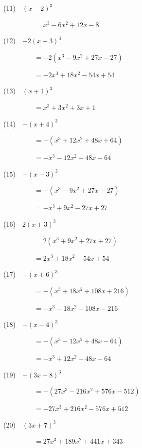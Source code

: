 \documentclass[a4j,twocolumn,10pt,fleqn]{jarticle}
\begin{document}
(11)~~$\left(x - 2\right)^{3}$

~~~~~~~~~$=x^{3} - 6 x^{2} + 12 x - 8$

(12)~~$-2\left(x - 3\right)^{3}$

~~~~~~~~~$=-2(x^{3} - 9 x^{2} + 27 x - 27)$

~~~~~~~~~$=- 2 x^{3} + 18 x^{2} - 54 x + 54$

(13)~~$\left(x + 1\right)^{3}$

~~~~~~~~~$=x^{3} + 3 x^{2} + 3 x + 1$

(14)~~$-\left(x + 4\right)^{3}$

~~~~~~~~~$=-(x^{3} + 12 x^{2} + 48 x + 64)$

~~~~~~~~~$=- x^{3} - 12 x^{2} - 48 x - 64$

(15)~~$-\left(x - 3\right)^{3}$

~~~~~~~~~$=-(x^{3} - 9 x^{2} + 27 x - 27)$

~~~~~~~~~$=- x^{3} + 9 x^{2} - 27 x + 27$

(16)~~$2\left(x + 3\right)^{3}$

~~~~~~~~~$=2(x^{3} + 9 x^{2} + 27 x + 27)$

~~~~~~~~~$=2 x^{3} + 18 x^{2} + 54 x + 54$

(17)~~$-\left(x + 6\right)^{3}$

~~~~~~~~~$=-(x^{3} + 18 x^{2} + 108 x + 216)$

~~~~~~~~~$=- x^{3} - 18 x^{2} - 108 x - 216$

(18)~~$-\left(x - 4\right)^{3}$

~~~~~~~~~$=-(x^{3} - 12 x^{2} + 48 x - 64)$

~~~~~~~~~$=- x^{3} + 12 x^{2} - 48 x + 64$

(19)~~$-\left(3 x - 8\right)^{3}$

~~~~~~~~~$=-(27 x^{3} - 216 x^{2} + 576 x - 512)$

~~~~~~~~~$=- 27 x^{3} + 216 x^{2} - 576 x + 512$

(20)~~$\left(3 x + 7\right)^{3}$

~~~~~~~~~$=27 x^{3} + 189 x^{2} + 441 x + 343$
\end{document}
